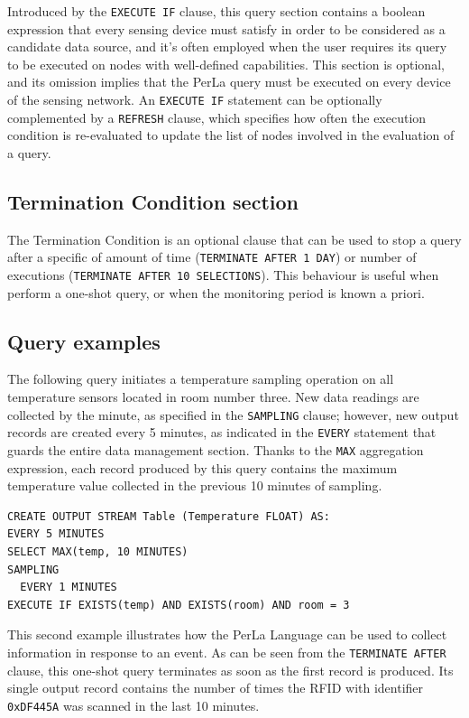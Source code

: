 Introduced by the \texttt{EXECUTE IF} clause, this query section contains a
boolean expression that every sensing device must satisfy in order to be
considered as a candidate data source, and it's often employed when the user
requires its query to be executed on nodes with well-defined capabilities. This
section is optional, and its omission implies that the PerLa query must be
executed on every device of the sensing network. An \texttt{EXECUTE IF}
statement can be optionally complemented by a \texttt{REFRESH} clause, which
specifies how often the execution condition is re-evaluated to update the list
of nodes involved in the evaluation of a query. 

\subsection{Termination Condition section}

The Termination Condition is an optional clause that can be used to stop a
query after a specific of amount of time (\lstinline!TERMINATE AFTER 1 DAY!) or
number of executions (\lstinline!TERMINATE AFTER 10 SELECTIONS!). This
behaviour is useful when perform a one-shot query, or when the monitoring
period is known a priori.

\subsection{Query examples}

The following query initiates a temperature sampling operation on all
temperature sensors located in room number three. New data readings are
collected by the minute, as specified in the \texttt{SAMPLING} clause; however,
new output records are created every 5 minutes, as indicated in the
\texttt{EVERY} statement that guards the entire data management section. Thanks
to the \texttt{MAX} aggregation expression, each record produced by this query
contains the maximum temperature value collected in the previous 10 minutes of
sampling.

\begin{lstlisting}
CREATE OUTPUT STREAM Table (Temperature FLOAT) AS:
EVERY 5 MINUTES
SELECT MAX(temp, 10 MINUTES)
SAMPLING
  EVERY 1 MINUTES
EXECUTE IF EXISTS(temp) AND EXISTS(room) AND room = 3
\end{lstlisting}


This second example illustrates how the PerLa Language can be used to collect
information in response to an event. As can be seen from the \texttt{TERMINATE
AFTER} clause, this one-shot query terminates as soon as the first record is
produced. Its single output record contains the number of times the RFID with
identifier \texttt{0xDF445A} was scanned in the last 10 minutes.

